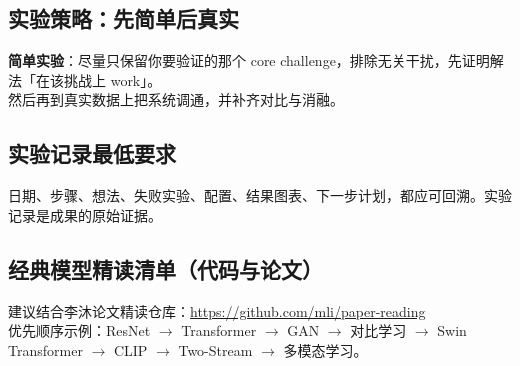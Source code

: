 \subsection{实验策略：先简单后真实}
\textbf{简单实验}：尽量只保留你要验证的那个 core challenge，排除无关干扰，先证明解法「在该挑战上 work」。\\
然后再到真实数据上把系统调通，并补齐对比与消融。

\subsection{实验记录最低要求}
日期、步骤、想法、失败实验、配置、结果图表、下一步计划，都应可回溯。实验记录是成果的原始证据。

\subsection{经典模型精读清单（代码与论文）}
建议结合李沐论文精读仓库：\url{https://github.com/mli/paper-reading}\\
优先顺序示例：ResNet $\rightarrow$ Transformer $\rightarrow$ GAN $\rightarrow$ 对比学习 $\rightarrow$ Swin Transformer $\rightarrow$ CLIP $\rightarrow$ Two-Stream $\rightarrow$ 多模态学习。
